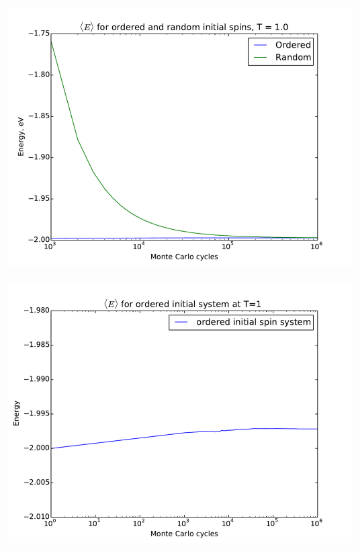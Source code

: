 \begin{figure}[H]
	\begin{subfigure}[b]{0.49\textwidth}
	\includegraphics[width=1\linewidth]{../results/4c/ran_order_T1}
\caption{}
\label{fig:ranordert1}
	\end{subfigure}
	\hfill
	\begin{subfigure}[b]{0.49\textwidth}
	\includegraphics[width=1\linewidth]{../results/4c/order_T1_start}
\caption{}
\label{fig:ordert1start}
	\end{subfigure}
	\caption{}
\end{figure}











